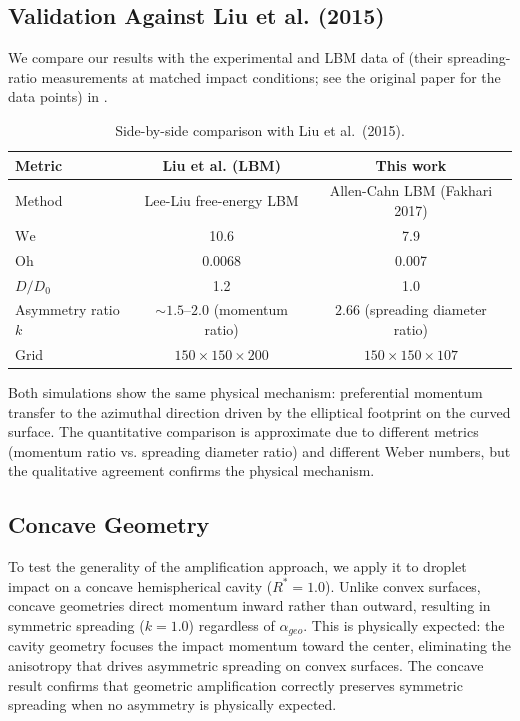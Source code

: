 \subsection{Validation Against Liu et al. (2015)}

We compare our results with the experimental and LBM data of \citet{liu2015symmetry} (their spreading-ratio measurements at matched impact conditions; see the original paper for the data points) in .

\begin{table}[htbp]
\centering
\caption{Side-by-side comparison with Liu et al.~(2015).}
\label{tab:liu_comparison}
\begin{tabular}{l|cc}
\hline
Metric & Liu et al. (LBM) & This work \\
\hline
Method & Lee-Liu free-energy LBM & Allen-Cahn LBM (Fakhari 2017) \\
$\mathrm{We}$ & 10.6 & 7.9 \\
$\mathrm{Oh}$ & 0.0068 & 0.007 \\
$D/D_0$ & 1.2 & 1.0 \\
Asymmetry ratio $k$ & $\sim 1.5$--$2.0$ (momentum ratio) & $2.66$ (spreading diameter ratio) \\
Grid & $150 \times 150 \times 200$ & $150 \times 150 \times 107$ \\
\hline
\end{tabular}
\end{table}

Both simulations show the same physical mechanism: preferential momentum transfer to the azimuthal direction driven by the elliptical footprint on the curved surface. The quantitative comparison is approximate due to different metrics (momentum ratio vs. spreading diameter ratio) and different Weber numbers, but the qualitative agreement confirms the physical mechanism.

\subsection{Concave Geometry}

To test the generality of the amplification approach, we apply it to droplet impact on a concave hemispherical cavity ($R^*=1.0$). Unlike convex surfaces, concave geometries direct momentum inward rather than outward, resulting in symmetric spreading ($k = 1.0$) regardless of $\alpha_{geo}$. This is physically expected: the cavity geometry focuses the impact momentum toward the center, eliminating the anisotropy that drives asymmetric spreading on convex surfaces. The concave result confirms that geometric amplification correctly preserves symmetric spreading when no asymmetry is physically expected.

